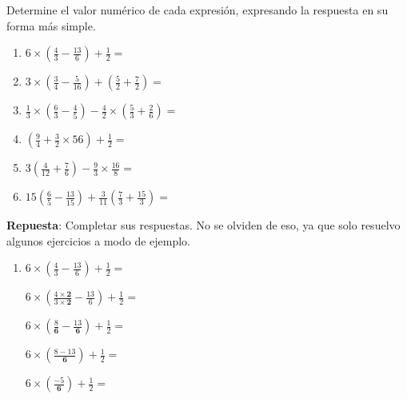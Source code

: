 \documentclass[11pt]{examdesign}
\theoremstyle{plain}
\theoremstyle{definition}
\theoremstyle{remark}
\begin{document}
    \begin{shortanswer}[title={\textit{Operaciones con fracciones.}},
    	rearrange=no,resetcounter=yes]
    	\begin{question}
    		Determine el valor numérico de cada expresión, expresando la respuesta en su forma más simple.
    		\begin{enumerate}
    			\item $6\times\left(\frac{4}{3}-\frac{13}{6}\right)+\frac{1}{2}=$
    			
    			\item $3\times\left(\frac{3}{4}-\frac{5}{16}\right)+\left(\frac{5}{2}+\frac{7}{2}\right)=$
    			
    			\item $\frac{1}{3}\times\left(\frac{6}{3}-\frac{4}{5}\right)-\frac{4}{2}\times\left(\frac{5}{3}+\frac{2}{6}\right)=$
    			
    			\item $\left(\frac{9}{4}+\frac{3}{2}\times{5}{6}\right)+\frac{1}{2}=$
    			
    			\item $3\left(\frac{4}{12}+\frac{7}{6}\right)-\frac{9}{3}\times\frac{16}{8}=$
    			
    			\item $15\left(\frac{6}{5}-\frac{13}{15}\right)+\frac{3}{11}\left(\frac{7}{3}+\frac{15}{3}\right)=$
    		\end{enumerate}
    		
    		\begin{answer}
    			\textbf{Repuesta}: Completar sus respuestas. No se olviden de eso, ya que solo resuelvo algunos ejercicios a modo de ejemplo.
    			
    			\begin{enumerate}
    				\item $6\times\left(\frac{4}{3}-\frac{13}{6}\right)+\frac{1}{2}=$
    				      
    				      $6\times\left(\frac{4\times\textbf{2}}{3\times\textbf{2}}-\frac{13}{6}\right)+\frac{1}{2}=$
    				      
    				      $6\times\left(\frac{8}{\textbf{6}}-\frac{13}{\textbf{6}}\right)+\frac{1}{2}=$
    				      
    				      $6\times\left(\frac{8-13}{\textbf{6}}\right)+\frac{1}{2}=$
    				      
    				      $6\times\left(\frac{-5}{\textbf{6}}\right)+\frac{1}{2}=$
    				      

\end{enumerate}
\end{answer}
\end{question}
\end{shortanswer}
\end{document}
